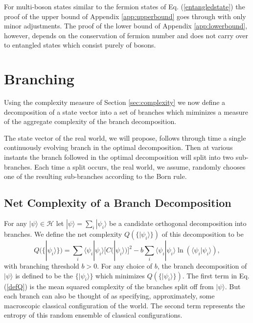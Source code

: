 \documentclass[12pt,amsmath,amssymb,onecolumn]{revtex4-2}
\begin{document}
For multi-boson states similar to
the fermion states of Eq. (\ref{entangledstate}) the
proof of the upper bound of
Appendix \ref{app:upperbound} goes through with only minor
adjustments. The proof of the
lower bound of Appendix \ref{app:lowerbound}, however,
depends on the conservation of fermion number and does not
carry over to entangled states which
consist purely of bosons.



\section{\label{sec:branching}Branching}

Using the complexity measure of Section \ref{sec:complexity} we now define a
decomposition of a state vector into a set of branches
which miminizes a measure of the aggregate complexity of
the branch decomposition.

The state vector of the real world, we will propose, follows through time
a single continuously evolving branch in the optimal decomposition.
Then at various instants the branch followed in the optimal decomposition
will split into two sub-branches. Each time a split occurs, the real world,
we assume,
randomly chooses one of the resulting sub-branches according to
the Born rule.

\subsection{\label{subsec:branchcomplexity} Net Complexity of a Branch Decomposition}


For any $|\psi \rangle  \in \mathcal{H}$ let 
 $ |\psi \rangle  = \sum_i |\psi_i \rangle $
be a candidate orthogonal decomposition into branches.
We define the net complexity $Q( \{|\psi_i \rangle \})$ of this decomposition to be
\begin{equation}\label{defQ} 
Q( \{|\psi_i \rangle \})  =  \sum_i \langle \psi_i | \psi_i \rangle  [C( |\psi_i \rangle )]^2 - 
 b \sum_i \langle \psi_i | \psi_i \rangle  \ln( \langle \psi_i |\psi_i \rangle ),
\end{equation} 
with branching threshold $b > 0$. For any choice of $b$, the branch
decomposition of $|\psi \rangle $ is defined to be the $\{|\psi_i \rangle  \}$ which minimizes
$Q(\{|\psi_i \rangle  \})$. The first term in Eq. (\ref{defQ}) is the mean squared complexity
of the branches split off from $|\psi \rangle $. But each branch can also be thought
of as specifying, approximately, some macroscopic classical configuration of the
world. The second term represents the entropy of this random ensemble
of classical configurations.
\end{document}
